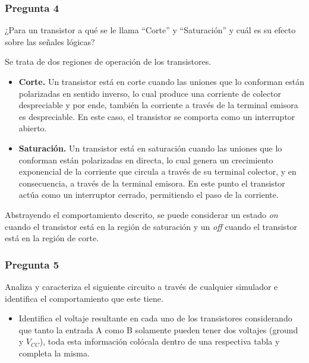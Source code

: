 \documentclass[../procedimientos.tex]{subfiles}
\begin{document}
\subsubsection*{Pregunta 4}
\begin{em}
  ¿Para un transistor a qué se le llama ``Corte'' y ``Saturación'' y cuál es su 
  efecto sobre las señales lógicas?
\end{em}
Se trata de dos regiones de operación de los transistores.
\begin{itemize}
  \item \textbf{Corte.} Un transistor está en corte cuando las uniones que lo 
    conforman están polarizadas en sentido inverso, lo cual produce una 
    corriente de colector despreciable y por ende, también la corriente a 
    través de la terminal emisora es despreciable. En este caso, el transistor 
    se comporta como un interruptor abierto.

  \item \textbf{Saturación.} Un transistor está en saturación cuando las 
    uniones que lo conforman están polarizadas en directa, lo cual genera un 
    crecimiento exponencial de la corriente que circula a través de su 
    terminal colector, y en consecuencia, a través de la terminal emisora. En 
    este punto el transistor actúa como un interruptor cerrado, permitiendo el 
    paso de la corriente.
\end{itemize}

Abstrayendo el comportamiento descrito, se puede considerar un estado 
\textit{on} cuando el transistor está en la región de saturación y un 
\textit{off} cuando el transistor está en la región de corte.

\subsubsection*{Pregunta 5}
\begin{em}
  Analiza y caracteriza el siguiente circuito a través de cualquier simulador 
  e identifica el comportamiento que este tiene.
  \begin{itemize}
    \item Identifica el voltaje resultante en cada uno de los transistores 
      considerando que tanto la entrada A como B solamente pueden tener dos 
      voltajes (ground y $V_{CC}$), toda esta información colócala dentro de 
      una respectiva tabla y completa la misma.
  \end{itemize}
\end{em}
\end{document}
